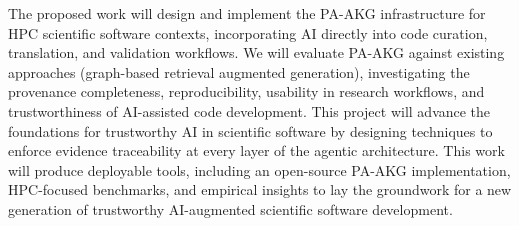 The proposed work will design and implement the PA-AKG infrastructure for HPC scientific software contexts, incorporating AI directly into code curation, translation, and validation workflows. We will evaluate PA-AKG against existing approaches (\eg graph-based retrieval augmented generation), investigating the provenance completeness, reproducibility, usability in research workflows, and trustworthiness of AI-assisted code development. This project will advance the foundations for trustworthy AI in scientific software by designing techniques to enforce evidence traceability at every layer of the agentic architecture. This work will produce deployable tools, including an open-source PA-AKG implementation, HPC-focused benchmarks, and empirical insights to lay the groundwork for a new generation of trustworthy AI-augmented scientific software development.